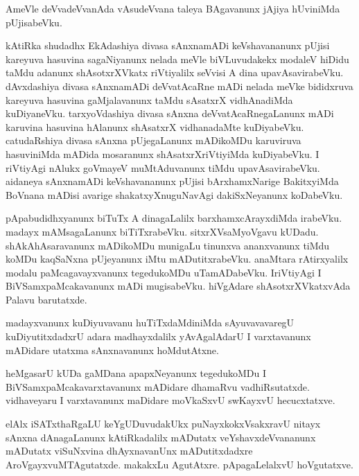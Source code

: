 \documentclass{article}
\begin{document}
\begin{mn}%
AmeVle deVvadeVvanAda vAsudeVvana taleya BAgavanunx jAjiya hUviniMda pUjisabeVku.
\end{mn}

\begin{mn}%
kAtiRka shudadhx EkAdashiya divasa sAnxnamADi keVshavananunx pUjisi kareyuva hasuvina sagaNiyanunx 
nelada meVle biVLuvudakekx modaleV hiDidu taMdu adanunx shAsotxrXVkatx riVtiyalilx seVvisi A dina 
upavAsavirabeVku. dAvxdashiya divasa sAnxnamADi deVvatAcaRne mADi nelada meVke bididxruva 
kareyuva hasuvina gaMjalavanunx taMdu sAsatxrX vidhAnadiMda kuDiyaneVku. tarxyoVdashiya divasa 
sAnxna deVvatAcaRnegaLanunx mADi karuvina hasuvina hAlanunx shAsatxrX vidhanadaMte kuDiyabeVku. 
catudaRshiya divasa sAnxna pUjegaLanunx mADikoMDu karuviruva hasuviniMda mADida mosaranunx 
shAsatxrXriVtiyiMda kuDiyabeVku. I riVtiyAgi nAlukx goVmayeV muMtAduvanunx tiMdu 
upavAsavirabeVku. aidaneya sAnxnamADi keVshavananunx pUjisi bArxhamxNarige BakitxyiMda BoVnana 
mADisi avarige shakatxyXnuguNavAgi dakiSxNeyanunx koDabeVku.
\end{mn}

\begin{mn}%
pApabudidhxyanunx biTuTx A dinagaLalilx barxhamxcArayxdiMda irabeVku. madayx mAMsagaLanunx 
biTiTxrabeVku. sitxrXVsaMyoVgavu kUDadu. shAkAhAsaravanunx mADikoMDu munigaLu tinunxva 
ananxvanunx tiMdu koMDu kaqSaNxna pUjeyanunx iMtu mADutitxrabeVku. anaMtara rAtirxyalilx modalu 
paMcagavayxvanunx tegedukoMDu uTamADabeVku. IriVtiyAgi I BiVSamxpaMcakavanunx mADi mugisabeVku. 
hiVgAdare shAsotxrXVkatxvAda Palavu barutatxde.
\end{mn}

\begin{mn}%
madayxvanunx kuDiyuvavanu huTiTxdaMdiniMda sAyuvavavaregU kuDiyutitxdadxrU adara madhayxdalilx 
yAvAgalAdarU I varxtavanunx mADidare utatxma sAnxnavanunx hoMdutAtxne.
\end{mn}

\begin{mn}%
heMgasarU kUDa gaMDana apapxNeyanunx tegedukoMDu I BiVSamxpaMcakavarxtavanunx mADidare dhamaRvu 
vadhiRsutatxde. vidhaveyaru I varxtavanunx maDidare moVkaSxvU swKayxvU hecucxtatxve.
\end{mn}

\begin{mn}%
elAlx iSATxthaRgaLU keYgUDuvudakUkx puNayxkokxVsakxravU nitayx sAnxna dAnagaLanunx kAtiRkadalilx 
mADutatx veYshavxdeVvananunx mADutatx viSuNxvina dhAyxnavanUnx mADutitxdadxre 
AroVgayxvuMTAgutatxde. makakxLu AgutAtxre. pApagaLelalxvU hoVgutatxve.
\end{mn}
\end{document}
